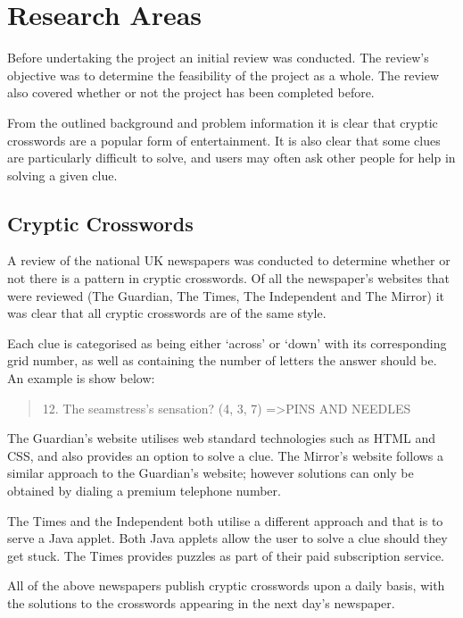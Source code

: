 \section{Research Areas}

Before undertaking the project an initial review was conducted. The review's 
objective was to determine the feasibility of the project as a whole. The 
review also covered whether or not the project has been completed before.

From the outlined background and problem information it is clear that cryptic 
crosswords are a popular form of entertainment. It is also clear that some 
clues are particularly difficult to solve, and users may often ask other people
for help in solving a given clue.


\subsection{Cryptic Crosswords}

A review of the national UK newspapers was conducted to determine whether or 
not there is a pattern in cryptic crosswords. Of all the newspaper's websites 
that were reviewed (The Guardian, The Times, The Independent and The Mirror) it 
was clear that all cryptic crosswords are of the same style.

Each clue is categorised as being either `across' or `down' with its 
corresponding grid number, as well as containing the number of letters the 
answer should be. An example is show below:

\begin{quote}
12. The seamstress's sensation? (4, 3, 7) =\textgreater  PINS AND NEEDLES
\end{quote}

The Guardian's website utilises web standard technologies such as HTML and CSS, 
and also provides an option to solve a clue. The Mirror's website follows a 
similar approach to the Guardian's website; however solutions can only be 
obtained by dialing a premium telephone number.

The Times and the Independent both utilise a different approach and that is to 
serve a Java applet. Both Java applets allow the user to solve a clue should 
they get stuck. The Times provides puzzles as part of their paid subscription 
service.

All of the above newspapers publish cryptic crosswords upon a daily basis, with
the solutions to the crosswords appearing in the next day's newspaper.

